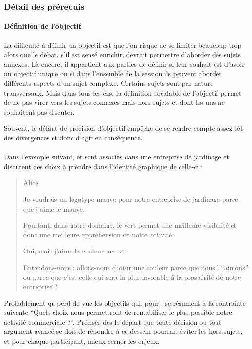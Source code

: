 \subsubsection{Détail des prérequis}
\paragraph{Définition de l’objectif}
La difficulté à définir un objectif est que l’on risque de se limiter beaucoup trop alors que le débat, s’il est sensé enrichir, devrait permettre d’aborder des sujets annexes. Là encore, il appartient aux parties de définir si leur souhait est d’avoir un objectif unique ou si dans l’ensemble de la session ils peuvent aborder différents aspects d’un sujet complexe. Certains sujets sont par nature transversaux. Mais dans tous les cas, la définition préalable de l’objectif permet de ne pas virer vers les sujets connexes mais hors sujets et dont les uns ne souhaitent pas discuter.

Souvent, le défaut de précision d’objectif empêche de se rendre compte assez tôt des divergences et donc d’agir en conséquence.

\paragraph{}
Dans l’exemple suivant, \A et \B sont associés dans une entreprise de jardinage et discutent des choix à prendre dans l’identité graphique de celle-ci :

\begin{quote}
  \begin{drama}{0cm}{0cm}{Alice}

    \Aspeaks Je voudrais un logotype mauve pour notre entreprise de jardinage parce que j’aime le mauve.

    \Bspeaks Pourtant, dans notre domaine, le vert permet une meilleure visibilité et donc une meilleure appréhension de notre activité.

    \Aspeaks Oui, mais j’aime la couleur mauve.

    \Bspeaks Entendons-nous : allons-nous choisir une couleur parce que nous l’\enquote{aimons} ou parce que c’est celle qui sera la plus favorable à la prospérité de notre entreprise ?

  \end{drama}
\end{quote}

Probablement qu’\A perd de vue les objectifs qui, pour \B, se résument à la contrainte suivante \enquote{Quels choix nous permettront de rentabiliser le plus possible notre activité commerciale ?}. Préciser dès le départ que toute décision ou tout argument avancé se doit de répondre à ce dessein pourrait éviter les hors sujets, et pour chaque participant, mieux cerner les enjeux.

